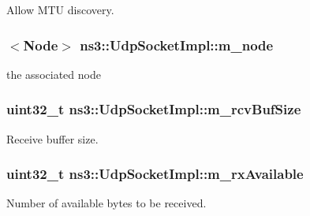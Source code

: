 Allow M\+TU discovery. 

\subsubsection[{\texorpdfstring{m\+\_\+node}{m_node}}]{$<${\bf Node}$>$ ns3\+::\+Udp\+Socket\+Impl\+::m\+\_\+node\hspace{0.3cm}{\ttfamily [private]}}\hypertarget{classns3_1_1UdpSocketImpl_af6a19247be3d8917b582af77337730c3}{}\label{classns3_1_1UdpSocketImpl_af6a19247be3d8917b582af77337730c3}


the associated node 

\subsubsection[{\texorpdfstring{m\+\_\+rcv\+Buf\+Size}{m_rcvBufSize}}]{\setlength{\rightskip}{0pt plus 5cm}uint32\+\_\+t ns3\+::\+Udp\+Socket\+Impl\+::m\+\_\+rcv\+Buf\+Size\hspace{0.3cm}{\ttfamily [private]}}\hypertarget{classns3_1_1UdpSocketImpl_a81c69f998616d1d79a9c81c569b725e9}{}\label{classns3_1_1UdpSocketImpl_a81c69f998616d1d79a9c81c569b725e9}


Receive buffer size. 

\subsubsection[{\texorpdfstring{m\+\_\+rx\+Available}{m_rxAvailable}}]{\setlength{\rightskip}{0pt plus 5cm}uint32\+\_\+t ns3\+::\+Udp\+Socket\+Impl\+::m\+\_\+rx\+Available\hspace{0.3cm}{\ttfamily [private]}}\hypertarget{classns3_1_1UdpSocketImpl_a73e12067139eb298bbb4b0e2c2e56a6a}{}\label{classns3_1_1UdpSocketImpl_a73e12067139eb298bbb4b0e2c2e56a6a}


Number of available bytes to be received. 

